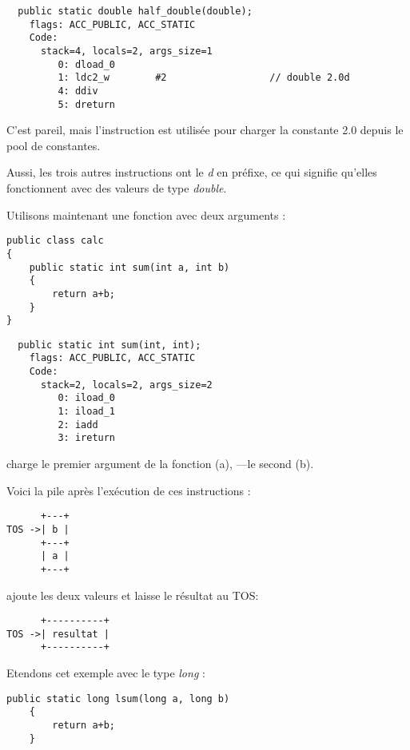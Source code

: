 \begin{lstlisting}
  public static double half_double(double);
    flags: ACC_PUBLIC, ACC_STATIC
    Code:
      stack=4, locals=2, args_size=1
         0: dload_0       
         1: ldc2_w        #2                  // double 2.0d
         4: ddiv          
         5: dreturn       
\end{lstlisting}

C'est pareil, mais l'instruction  est utilisée pour charger la constante
2.0 depuis le pool de constantes.

Aussi, les trois autres instructions ont le \emph{d} en préfixe,
ce qui signifie qu'elles fonctionnent avec des valeurs de type \emph{double}.


Utilisons maintenant une fonction avec deux arguments :

\begin{lstlisting}[style=customjava]
public class calc
{
	public static int sum(int a, int b)
	{
		return a+b;
	}
}
\end{lstlisting}

\begin{lstlisting}
  public static int sum(int, int);
    flags: ACC_PUBLIC, ACC_STATIC
    Code:
      stack=2, locals=2, args_size=2
         0: iload_0       
         1: iload_1       
         2: iadd          
         3: ireturn       
\end{lstlisting}

 charge le premier argument de la fonction (a), ---le second (b).

Voici la pile après l'exécution de ces instructions :

\begin{lstlisting}
      +---+
TOS ->| b |
      +---+
      | a |
      +---+
\end{lstlisting}

 ajoute les deux valeurs et laisse le résultat au \ac{TOS}:


\begin{lstlisting}
      +----------+
TOS ->| resultat |
      +----------+
\end{lstlisting}

Etendons cet exemple avec le type \emph{long} :


\begin{lstlisting}[style=customjava]
	public static long lsum(long a, long b)
	{
		return a+b;
	}
\end{lstlisting}

